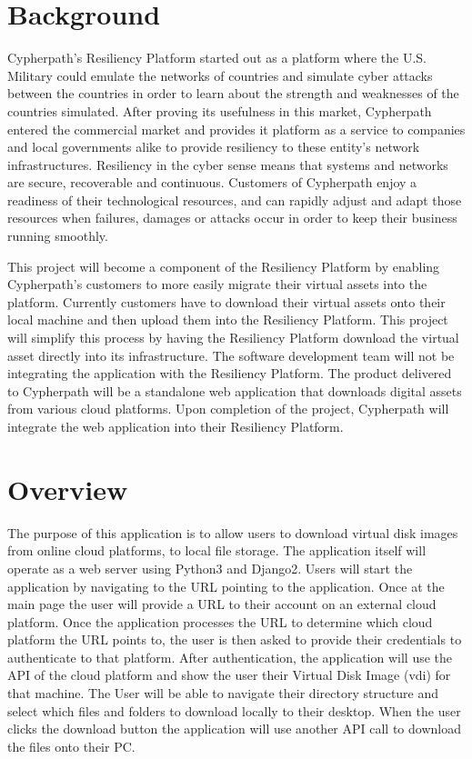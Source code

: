 \documentclass{article}
\begin{document}
    \section{Background}
    Cypherpath's Resiliency Platform started out as a platform where the U.S. Military could emulate the networks of countries and simulate cyber attacks between the countries in order to
    learn about the strength and weaknesses of the countries simulated. After proving its usefulness in this market, Cypherpath entered the commercial market and provides it platform as a service to
    companies and local governments alike to provide resiliency to these entity's network infrastructures. Resiliency in the cyber sense means that systems and networks are secure, recoverable and
    continuous. Customers of Cypherpath enjoy a readiness of their technological resources, and can rapidly adjust and adapt those resources when failures, damages or attacks occur in order to keep their business running smoothly.

    This project will become a component of the Resiliency Platform by enabling Cypherpath's customers to more easily migrate their virtual assets into the platform. Currently customers have to download
    their virtual assets onto their local machine and then upload them into the Resiliency Platform. This project will simplify this process by having the Resiliency Platform download the virtual asset directly
    into its infrastructure. The software development team will not be integrating the application with the Resiliency Platform. The product delivered to Cypherpath will be a standalone web application that downloads
    digital assets from various cloud platforms. Upon completion of the project, Cypherpath will integrate the web application into their Resiliency Platform.


	
    \section{Overview}
    The purpose of this application is to allow users to download virtual disk images from online cloud platforms, to local file storage.
    The application itself will operate as a web server using Python3 and Django2. Users will start the application by navigating to the URL pointing to the application.
    Once at the main page the user will
    provide a URL to their account on an external cloud platform. Once the application processes the URL to determine which cloud platform the URL points to, the user is
    then asked to provide their credentials to authenticate
    to that platform. After authentication, the application will use the API of the cloud platform and show the user their Virtual Disk Image (vdi) for that machine.
    The User will be able to navigate their directory structure and select which files and folders to download locally to their desktop.
    When the user clicks the download button the application will use another API call to download the files onto their PC.
\end{document}
